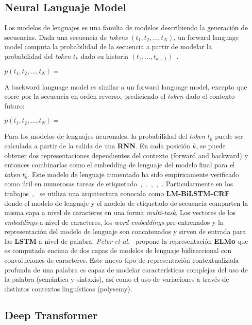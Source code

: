 \subsection{Neural Languaje Model}

Los modelos de lenguajes es una familia de modelos describiendo la generaci\'on de secuencias. Dada una secuencia de \emph{tokens} $(t_1, t_2, ..., t_N)$, un forward language model computa la probabilidad de la secuencia a partir de modelar la probabilidad del \emph{token} $t_k$ dado su historia $(t_1,...,t_{k-1})$~\cite{peters2017semi}.

$p(t_1, t_2, ..., t_N) = $

A backward language model es similar a un forward language model, excepto que corre por la secuencia en orden reverso, prediciendo el \emph{token} dado el contexto futuro:

$p(t_1, t_2, ..., t_N) = $

Para los modelos de lenguajes neuronales, la probabilidad del \emph{token} $t_k$ puede ser calculada a partir de la salida de una \textbf{RNN}. En cada posici\'on $k$, se puede obtener dos representaciones dependientes del contexto (forward and backward) y entonces combinarlas como el embedding de lenguaje del modelo final para el \emph{token} $t_k$. Este modelo de lenguaje aumentado ha sido emp\'iricamente verificado como \'util en numerosas tareas de etiquetado~\cite{peters2017semi},~\cite{peters2018deep},~\cite{rei2017semi},~\cite{liu2018efficient},~\cite{liu2018empower}. Particularmente en los trabajos~\cite{liu2018efficient},~\cite{liu2018empower} se utiliza una arquitectura conocida como \textbf{LM-BiLSTM-CRF} donde el modelo de lenguaje y el modelo de etiquetado de secuencia comparten la misma capa a nivel de caracteres en una forma \emph{multi-task}. Los vectores de los \emph{embeddings} a nivel de caracteres, los \emph{word embeddings} pre-entrenados y la representaci\'on del modelo de lenguaje son concatenados y sirven de entrada para las \textbf{LSTM} a nivel de palabra. \emph{Peter et al.}~\cite{peters2018deep} propone la representaci\'on \textbf{ELMo} que es computada encima de dos capas de modelos de lenguaje bidireccional con convoluciones de caracteres. Este nuevo tipo de representaci\'on contextualizada profunda de una palabra es capaz de modelar caracter\'isticas complejas del uso de la palabra (sem\'antica y sintaxis), as\'i como el uso de variaciones a trav\'es de distintos contextos lingu\'isticos (polysemy).

\subsection{Deep Transformer}

